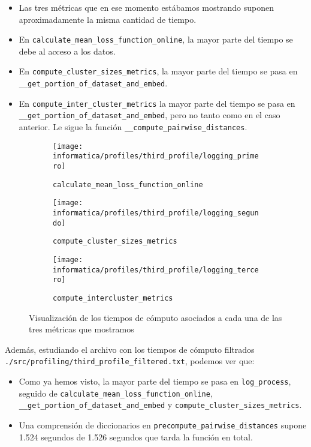 \begin{sloppypar}
	\begin{itemize}
		\item Las tres métricas que en ese momento estábamos mostrando suponen aproximadamente la misma cantidad de tiempo.
		\item En \lstinline{calculate_mean_loss_function_online}, la mayor parte del tiempo se debe al acceso a los datos.
		\item En \lstinline{compute_cluster_sizes_metrics}, la mayor parte del tiempo se pasa en \lstinline{__get_portion_of_dataset_and_embed}.
		\item En \lstinline[breaklines=true]{compute_inter_cluster_metrics} la mayor parte del tiempo se pasa en \lstinline[breaklines=true]{__get_portion_of_dataset_and_embed}, pero no tanto como en el caso anterior. Le sigue la función \lstinline{__compute_pairwise_distances}.
	\end{itemize}
\end{sloppypar}

\begin{figure}[!hbtp]
	\centering
	\begin{subfigure}{.5\textwidth}
		\centering
		\texttt{[image: informatica/profiles/third\_profile/logging\_primero]}
		\caption{\lstinline{calculate_mean_loss_function_online}}
	\end{subfigure}%
	\begin{subfigure}{.5\textwidth}
		\centering
		\texttt{[image: informatica/profiles/third\_profile/logging\_segundo]}
		\caption{\lstinline{compute_cluster_sizes_metrics}}
	\end{subfigure}

	\begin{subfigure}{.7\textwidth}
		\centering
		\texttt{[image: informatica/profiles/third\_profile/logging\_tercero]}
		\caption{\lstinline{compute_intercluster_metrics}}
	\end{subfigure}
	\caption{Visualización de los tiempos de cómputo asociados a cada una de las tres métricas que mostramos}
	\label{img:optimizacion_05}
\end{figure}

Además, estudiando el archivo con los tiempos de cómputo filtrados \lstinline{./src/profiling/third_profile_filtered.txt}, podemos ver que:

\begin{itemize}
	\item Como ya hemos visto, la mayor parte del tiempo se pasa en \lstinline{log_process}, seguido de \lstinline{calculate_mean_loss_function_online}, \lstinline{__get_portion_of_dataset_and_embed} y \lstinline{compute_cluster_sizes_metrics}.
	\item Una comprensión de diccionarios en \lstinline{precompute_pairwise_distances} supone 1.524 segundos de 1.526 segundos que tarda la función en total.
\end{itemize}

